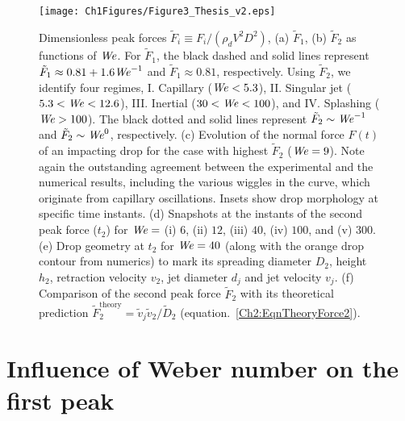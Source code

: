 \begin{figure}
	\centering
	\texttt{[image: Ch1Figures/Figure3\_Thesis\_v2.eps]}
	\caption{Dimensionless peak forces $\tilde{F}_i \equiv F_i/\left(\rho_d V^2D^2\right)$, (a) $\tilde{F}_1$, (b) $\tilde{F}_2$ as functions of $\mathit{We}$. For $\tilde{F}_1$, the black dashed and solid lines represent $\tilde{F}_1 \approx 0.81 + 1.6\mathit{We}^{-1}$ and $\tilde{F}_1 \approx 0.81$, respectively. Using $\tilde{F}_2$, we identify four regimes, I. Capillary ($\mathit{We} < 5.3$), II. Singular jet ($5.3 < \mathit{We} < 12.6$), III. Inertial ($30 < \mathit{We} < 100$), and IV. Splashing ($\mathit{We} > 100$). The black dotted and solid lines represent $\tilde{F}_2 \sim \mathit{We}^{-1}$ and $\tilde{F}_2 \sim \mathit{We}^0$, respectively.  (c) Evolution of the normal force $F(t)$ of an impacting drop for the case with highest $\tilde{F}_2$ ($\mathit{We} = 9$). Note again the outstanding agreement between the experimental and the numerical results, including the various wiggles in the curve, which originate from capillary oscillations. Insets show drop morphology at specific time instants. (d) Snapshots at the instants of the second peak force ($t_2$) for $\mathit{We} =$ (i) $6$, (ii) $12$, (iii) $40$, (iv) $100$, and (v) $300$. (e) Drop geometry at $t_2$ for $\mathit{We} = 40$ (along with the orange drop contour from numerics) to mark its spreading diameter $D_2$, height $h_2$, retraction velocity $v_2$, jet diameter $d_j$ and jet velocity $v_j$. (f) Comparison of the second peak force $\tilde{F}_2$ with its theoretical prediction $\tilde{F}_2^{\text{theory}} = \tilde{v}_j\tilde{v}_2/\tilde D_2$ (equation.~\eqref{Ch2:EqnTheoryForce2}).}
	\label{Ch2:FigMain}
\end{figure}

\section{Influence of Weber number on the first peak}\label{Ch2:SecFirstPeak}

